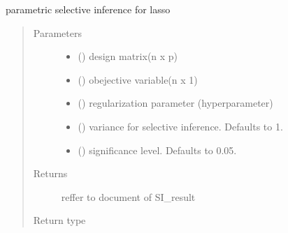 \documentclass[letterpaper,10pt,english]{sphinxmanual}
\begin{document}
\begin{fulllineitems}
\label{\detokenize{selective:selective_inference.lasso_si.parametric_lasso_si}}
parametric selective inference for lasso
\begin{quote}\begin{description}
\item[{Parameters}] \leavevmode\begin{itemize}
\item {} 
 () \textendash{} design matrix(n x p)

\item {} 
 () \textendash{} obejective variable(n x 1)

\item {} 
 () \textendash{} regularization parameter (hyperparameter)

\item {} 
 (\sphinxstyleliteralemphasis{\sphinxupquote{, }}) \textendash{} variance for selective inference. Defaults to 1.

\item {} 
 (\sphinxstyleliteralemphasis{\sphinxupquote{, }}) \textendash{} significance level. Defaults to 0.05.

\end{itemize}

\item[{Returns}] \leavevmode
reffer to document of SI\_result

\item[{Return type}] \leavevmode
{\hyperref[\detokenize{selective:selective_inference.si.SI_result}]{}}

\end{description}\end{quote}

\end{fulllineitems}
\end{document}

